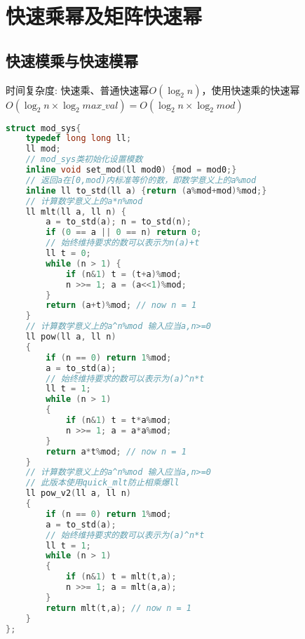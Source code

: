 \section{快速乘幂及矩阵快速幂}
    \subsection{快速模乘与快速模幂}
        \par 时间复杂度: 快速乘、普通快速幂$O(\log_2{n})$，使用快速乘的快速幂$O(\log_2{n} \times \log_2{max\_val})=O(\log_2{n} \times \log_2{mod})$
        \begin{lstlisting}[language={c++}]
struct mod_sys{
    typedef long long ll;
    ll mod;
    // mod_sys类初始化设置模数
    inline void set_mod(ll mod0) {mod = mod0;}
    // 返回a在[0,mod)内标准等价的数，即数学意义上的a%mod
    inline ll to_std(ll a) {return (a%mod+mod)%mod;}
    // 计算数学意义上的a*n%mod
    ll mlt(ll a, ll n) {
        a = to_std(a); n = to_std(n);
        if (0 == a || 0 == n) return 0;
        // 始终维持要求的数可以表示为n(a)+t
        ll t = 0;
        while (n > 1) {
            if (n&1) t = (t+a)%mod;
            n >>= 1; a = (a<<1)%mod;
        }
        return (a+t)%mod; // now n = 1
    }
    // 计算数学意义上的a^n%mod 输入应当a,n>=0
    ll pow(ll a, ll n)
    {   
        if (n == 0) return 1%mod;
        a = to_std(a);
        // 始终维持要求的数可以表示为(a)^n*t
        ll t = 1;
        while (n > 1)
        {
            if (n&1) t = t*a%mod;
            n >>= 1; a = a*a%mod;
        }
        return a*t%mod; // now n = 1
    }
    // 计算数学意义上的a^n%mod 输入应当a,n>=0
    // 此版本使用quick_mlt防止相乘爆ll
    ll pow_v2(ll a, ll n)
    {   
        if (n == 0) return 1%mod;
        a = to_std(a);
        // 始终维持要求的数可以表示为(a)^n*t
        ll t = 1;
        while (n > 1)
        {
            if (n&1) t = mlt(t,a);
            n >>= 1; a = mlt(a,a);
        }
        return mlt(t,a); // now n = 1
    }
};
        \end{lstlisting}
